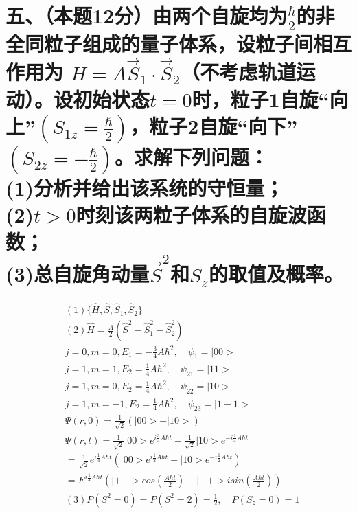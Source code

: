 \documentclass[UTF8]{ctexart}
\begin{document}
\section*{五、（本题12分）由两个自旋均为$\frac{\hbar}{2}$的非全同粒子组成的量子体系，设粒子间相互作用为
  $H=A\vec S_1\cdot\vec S_2$（不考虑轨道运动）。设初始状态$t=0$时，粒子1自旋“向上”$(S_{1z}=
    \frac{\hbar}{2})$，粒子2自旋“向下”$(S_{2z}=-\frac{\hbar}{2})$。求解下列问题：\\
  (1)分析并给出该系统的守恒量；\\
  (2)$t>0$时刻该两粒子体系的自旋波函数；\\
  (3)总自旋角动量$\vec S^2$和$S_z$的取值及概率。}
\begin{equation*}
  \begin{aligned}
     & (1)\{\hat H,\hat S,\hat S_1,\hat S_2\}                                      \\
     & (2)\hat H=\frac{A}{2}(\hat S^2-\hat S_1^2-\hat S_2^2)                       \\
     & j=0,m=0,E_1=-\frac{3}{4}A\hbar^2,\quad\psi_1=\lvert00>                      \\
     & j=1,m=1,E_2=\frac{1}{4}A\hbar^2,\quad\psi_{21}=\lvert11>                    \\
     & j=1,m=0,E_2=\frac{1}{4}A\hbar^2,\quad\psi_{22}=\lvert10>                    \\
     & j=1,m=-1,E_2=\frac{1}{4}A\hbar^2,\quad\psi_{23}=\lvert1-1>                  \\
     & \Psi(r,0)=\frac{1}{\sqrt2}(\lvert00>+\lvert10>)                             \\
     & \Psi(r,t)=\frac{1}{\sqrt2}\lvert00>e^{i\frac{3}{4}A\hbar t}
    +\frac{1}{\sqrt2}\lvert10>e^{-i\frac{1}{4}A\hbar t}                            \\
     & =\frac{1}{\sqrt2}e^{i\frac{1}{4}A\hbar t}(\lvert00>e^{i\frac{1}{2}A\hbar t}
    +\lvert10>e^{-i\frac{1}{2}A\hbar t})                                           \\
     & =E^{i\frac{1}{4}A\hbar t}(\lvert+->cos(\frac{A\hbar t}{2})
    -\lvert-+>isin(\frac{A\hbar t}{2}))                                            \\
     & (3)P(S^2=0)=P(S^2=2)=\frac{1}{2},\quad P(S_z=0)=1                           \\
  \end{aligned}
\end{equation*}
\end{document}
